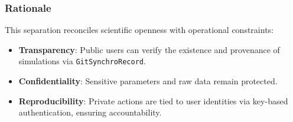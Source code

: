 \subsubsection*{Rationale}
This separation reconciles scientific openness with operational constraints:
\begin{itemize}
    \item \textbf{Transparency}: Public users can verify the existence and provenance of simulations via \texttt{GitSynchroRecord}.
    \item \textbf{Confidentiality}: Sensitive parameters and raw data remain protected.
    \item \textbf{Reproducibility}: Private actions are tied to user identities via key-based authentication, ensuring accountability.
\end{itemize}


